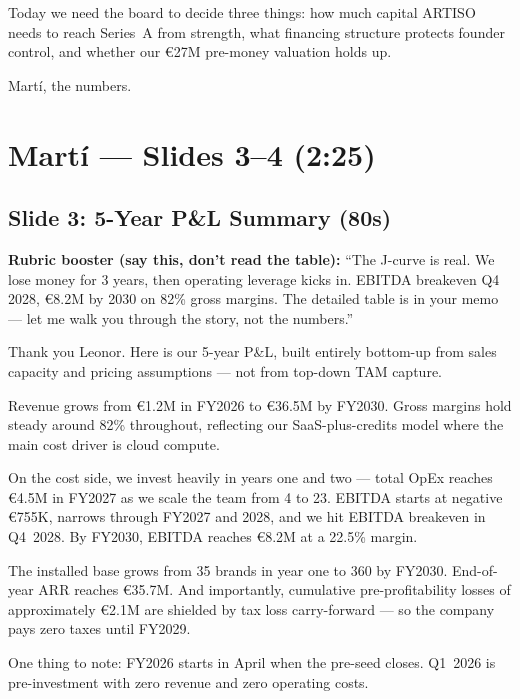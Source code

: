 \documentclass[11pt,a4paper]{article}
\begin{document}
Today we need the board to decide three things: how much capital ARTISO needs to reach Series~A from strength, what financing structure protects founder control, and whether our \euro{}27M pre-money valuation holds up.

Mart\'{i}, the numbers.

\section{Mart\'{i} --- Slides 3--4 (2:25)}

\subsection{Slide 3: 5-Year P\&L Summary (\texttildelow80s)}

\colorbox{artiso!10}{\parbox{\dimexpr\textwidth-2\fboxsep}{%
\small\color{artiso}\textbf{Rubric booster (say this, don't read the table):} ``The J-curve is real. We lose money for 3 years, then operating leverage kicks in. EBITDA breakeven Q4 2028, \euro{}8.2M by 2030 on 82\% gross margins. The detailed table is in your memo --- let me walk you through the story, not the numbers.''
}}\vspace{4pt}

Thank you Leonor. Here is our 5-year P\&L, built entirely bottom-up from sales capacity and pricing assumptions --- not from top-down TAM capture.

Revenue grows from \euro{}1.2M in FY2026 to \euro{}36.5M by FY2030. Gross margins hold steady around 82\% throughout, reflecting our SaaS-plus-credits model where the main cost driver is cloud compute.

On the cost side, we invest heavily in years one and two --- total OpEx reaches \euro{}4.5M in FY2027 as we scale the team from 4 to 23. EBITDA starts at negative \euro{}755K, narrows through FY2027 and 2028, and we hit EBITDA breakeven in Q4~2028. By FY2030, EBITDA reaches \euro{}8.2M at a 22.5\% margin.

The installed base grows from 35 brands in year one to 360 by FY2030. End-of-year ARR reaches \euro{}35.7M. And importantly, cumulative pre-profitability losses of approximately \euro{}2.1M are shielded by tax loss carry-forward --- so the company pays zero taxes until FY2029.

One thing to note: FY2026 starts in April when the pre-seed closes. Q1~2026 is pre-investment with zero revenue and zero operating costs.
\end{document}
